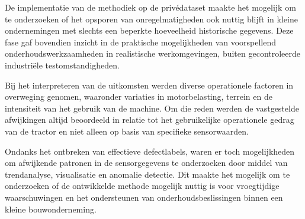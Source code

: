 De implementatie van de methodiek op de privédataset maakte het mogelijk om te onderzoeken of het opsporen van onregelmatigheden ook nuttig blijft in kleine ondernemingen met slechts een beperkte hoeveelheid historische gegevens. Deze fase gaf bovendien inzicht in de praktische mogelijkheden van voorspellend onderhoudswerkzaamheden in realistische werkomgevingen, buiten gecontroleerde industriële testomstandigheden.

Bij het interpreteren van de uitkomsten werden diverse operationele factoren in overweging genomen, waaronder variaties in motorbelasting, terrein en de intensiteit van het gebruik van de machine. Om die reden werden de vastgestelde afwijkingen altijd beoordeeld in relatie tot het gebruikelijke operationele gedrag van de tractor en niet alleen op basis van specifieke sensorwaarden.

Ondanks het ontbreken van effectieve defectlabels, waren er toch mogelijkheden om afwijkende patronen in de sensorgegevens te onderzoeken door middel van trendanalyse, visualisatie en anomalie detectie. Dit maakte het mogelijk om te onderzoeken of de ontwikkelde methode mogelijk nuttig is voor vroegtijdige waarschuwingen en het ondersteunen van onderhoudsbeslissingen binnen een kleine bouwonderneming.




